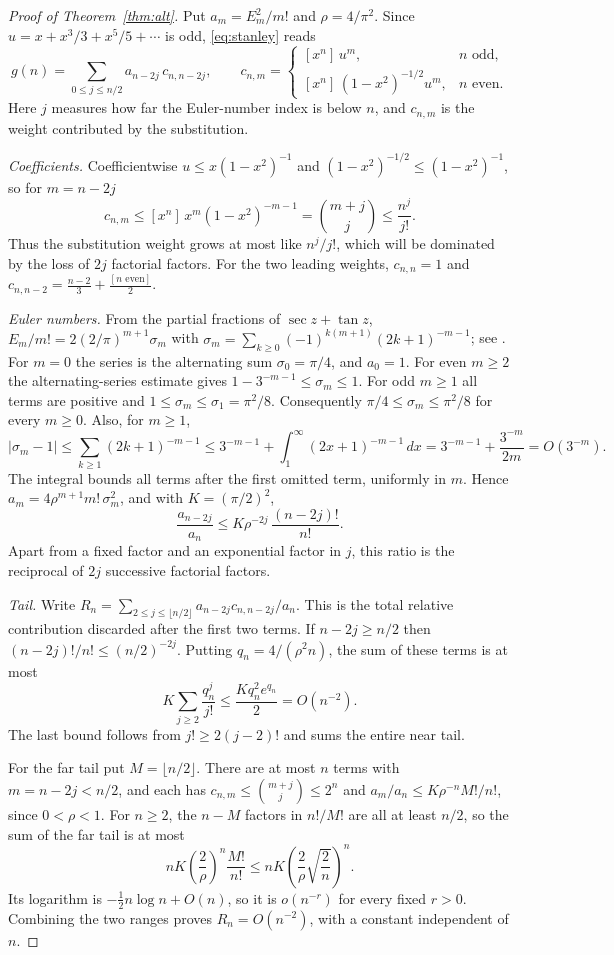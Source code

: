 \documentclass[12pt]{article}
\numberwithin{theorem}{section}
\numberwithin{equation}{section}
\begin{document}
\begin{proof}[Proof of Theorem~\ref{thm:alt}]
Put $a_m=E_m^2/m!$ and $\rho=4/\pi^2$. Since $u=x+x^3/3+x^5/5+\cdots$ is odd, \eqref{eq:stanley} reads
\[
g(n)=\sum_{0\le j\le n/2}a_{n-2j}\,c_{n,n-2j},\qquad c_{n,m}=\begin{cases}[x^n]\,u^m,& n\text{ odd},\\
[x^n]\,(1-x^2)^{-1/2}u^m,& n\text{ even}.\end{cases}
\]
Here $j$ measures how far the Euler-number index is below $n$, and $c_{n,m}$ is the weight contributed by the substitution.

\emph{Coefficients.} Coefficientwise $u\le x(1-x^2)^{-1}$ and $(1-x^2)^{-1/2}\le(1-x^2)^{-1}$, so for
$m=n-2j$
\[
c_{n,m}\le[x^n]\,x^m(1-x^2)^{-m-1}=\binom{m+j}{j}\le\frac{n^j}{j!}.
\]
Thus the substitution weight grows at most like $n^j/j!$, which will be dominated by the loss of $2j$ factorial factors. For the two leading weights, $c_{n,n}=1$ and $c_{n,n-2}=\frac{n-2}{3}+\frac{[n\text{ even}]}{2}$.

\emph{Euler numbers.} From the partial fractions of $\sec z+\tan z$,
$E_m/m!=2(2/\pi)^{m+1}\sigma_m$ with $\sigma_m=\sum_{k\ge0}(-1)^{k(m+1)}(2k+1)^{-m-1}$; see
\cite{stanleySurvey}. For $m=0$ the series is the alternating sum $\sigma_0=\pi/4$, and $a_0=1$.
For even $m\ge2$ the alternating-series estimate gives $1-3^{-m-1}\le\sigma_m\le1$.
For odd $m\ge1$ all terms are positive and $1\le\sigma_m\le\sigma_1=\pi^2/8$.
Consequently $\pi/4\le\sigma_m\le\pi^2/8$ for every $m\ge0$. Also, for $m\ge1$,
\[
|\sigma_m-1|\le\sum_{k\ge1}(2k+1)^{-m-1}
\le 3^{-m-1}+\int_1^\infty(2x+1)^{-m-1}\,dx
=3^{-m-1}+\frac{3^{-m}}{2m}=O(3^{-m}).
\]
The integral bounds all terms after the first omitted term, uniformly in $m$.
Hence $a_m=4\rho^{m+1}m!\,\sigma_m^2$, and with $K=(\pi/2)^2$,
\[
\frac{a_{n-2j}}{a_n}\le K\rho^{-2j}\,\frac{(n-2j)!}{n!}.
\]
Apart from a fixed factor and an exponential factor in $j$, this ratio is the reciprocal of $2j$ successive factorial factors.

\emph{Tail.} Write $R_n=\sum_{2\le j\le\lfloor n/2\rfloor}a_{n-2j}c_{n,n-2j}/a_n$.
This is the total relative contribution discarded after the first two terms.
If $n-2j\ge n/2$ then $(n-2j)!/n!\le(n/2)^{-2j}$.
Putting $q_n=4/(\rho^2n)$, the sum of these terms is at most
\[
K\sum_{j\ge2}\frac{q_n^j}{j!}\le\frac{Kq_n^2e^{q_n}}2=O(n^{-2}).
\]
The last bound follows from $j!\ge2(j-2)!$ and sums the entire near tail.

For the far tail put $M=\lfloor n/2\rfloor$.
There are at most $n$ terms with $m=n-2j<n/2$, and each has
$c_{n,m}\le\binom{m+j}{j}\le2^n$ and
$a_m/a_n\le K\rho^{-n}M!/n!$, since $0<\rho<1$.
For $n\ge2$, the $n-M$ factors in $n!/M!$ are all at least $n/2$, so the sum of the far tail is at most
\[
nK\left(\frac2\rho\right)^n\frac{M!}{n!}
\le nK\left(\frac2\rho\sqrt{\frac2n}\right)^n.
\]
Its logarithm is $-\tfrac12n\log n+O(n)$, so it is $o(n^{-r})$ for every fixed $r>0$.
Combining the two ranges proves $R_n=O(n^{-2})$, with a constant independent of $n$.


\end{proof}
\end{document}
